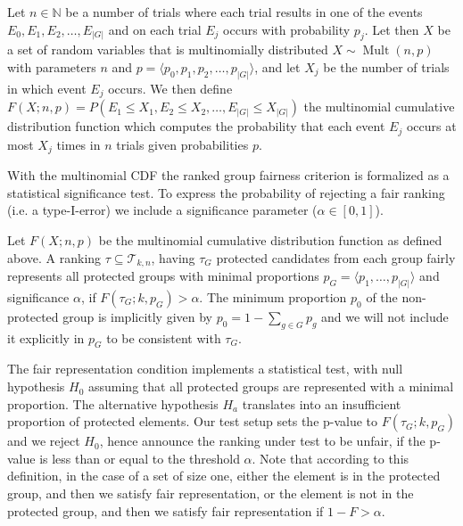 \begin{definition}
	\label{def:multinomialCDF}
	Let $ n \in \mathbb{N}$ be a number of trials where each trial results in one of the events $ E_0, E_1, E_2, \ldots, E_{|G|} $ and on each trial $ E_j $ occurs with probability $ p_j $.
	Let then $X$ %
	be a set of random variables that is multinomially distributed $ X \sim \operatorname{Mult}(n, p)$ with parameters $ n $ and $ p = \langle p_0, p_1, p_2, \ldots, p_{|G|} \rangle$, and let $ X_j $ be the number of trials in which event $ E_j $ occurs.
	We then define $ F\left(X; n, p\right) = P\left(E_1 \leq X_1, E_2 \leq X_2, \ldots, E_{|G|} \leq X_{|G|}\right)$ the multinomial cumulative distribution function which computes the probability that each event $ E_j $ occurs at most $ X_j $ times in $ n $ trials given probabilities $ p $.
\end{definition}
With the multinomial CDF the ranked group fairness criterion is formalized as a statistical significance test.
%
To express the probability of rejecting a fair ranking (i.e. a type-I-error) we include a significance parameter ($\alpha \in [0,1]$).

\begin{definition}
	\label{def:fair-representation-condition}
	Let $F(X;n,p)$ be the multinomial cumulative distribution function as defined above.
	A ranking $\tau \subseteq \mathcal{T}_{k,n}$, having $\tau_G$ protected candidates from each group fairly represents all protected groups with minimal proportions $p_G = \langle p_1, \ldots, p_{|G|}\rangle$ and significance $\alpha$,
	if $F(\tau_G;k,p_G) > \alpha$. 
	The minimum proportion $p_0$ of the non-protected group is implicitly given by $p_0 = 1 - \sum_{g \in G} p_g$ and we will not include it explicitly in $p_G$ to be consistent with $\tau_G$.
\end{definition}

The fair representation condition implements a statistical test, with null hypothesis $H_0$ assuming that all protected groups are represented with a minimal proportion.
%
The alternative hypothesis $H_a$ translates into an insufficient proportion of protected elements.
%
Our test setup sets the p-value to $F(\tau_G; k, p_G)$ and we reject $H_0$, hence announce the ranking under test to be unfair, if the p-value is less than or equal to the threshold $\alpha$.
%
Note that according to this definition, in the case of a set of size one, either the element is in the protected group, and then we satisfy fair representation, or the element is not in the protected group, and then we satisfy fair representation if $1 - F > \alpha$.

